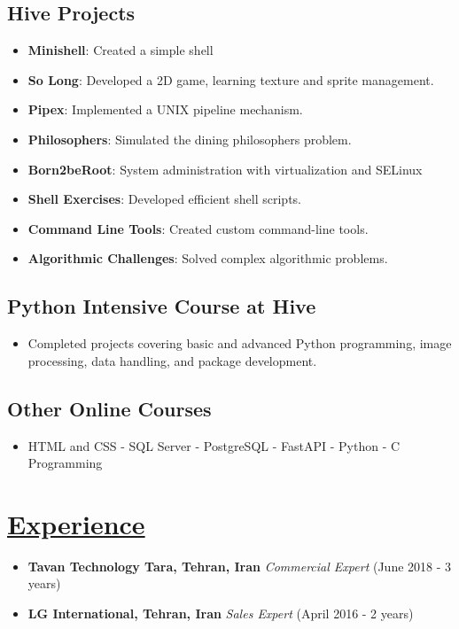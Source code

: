 \documentclass[a4paper,9pt]{article}
\newcommand{\mainsection}[1]{\underline{#1}}
\begin{document}
\subsection*{Hive Projects}
\setlength{\columnsep}{20pt} %
\begin{multicols}{2}
\begin{itemize}[leftmargin=*]
    \raggedcolumns %
    \item \textbf{Minishell}: Created a simple shell
    \item \textbf{So Long}: Developed a 2D game, learning texture and sprite management.
    \item \textbf{Pipex}: Implemented a UNIX pipeline mechanism.
    \item \textbf{Philosophers}: Simulated the dining philosophers problem.\columnbreak
     \vspace{\columnsep}
    \item \textbf{Born2beRoot}: System administration with virtualization and SELinux
    \item \textbf{Shell Exercises}: Developed efficient shell scripts.
    \item \textbf{Command Line Tools}: Created custom command-line tools.
    \item \textbf{Algorithmic Challenges}: Solved complex algorithmic problems.
  \end{itemize}
\end{multicols}

\subsection*{Python Intensive Course at Hive}
\begin{itemize}[leftmargin=*]
  \item Completed projects covering basic and advanced Python programming, image processing, data handling, and package development.
\end{itemize}

\subsection*{Other Online Courses}
\begin{itemize}[leftmargin=*]
  \item HTML and CSS - SQL Server - PostgreSQL - FastAPI - Python - C Programming
\end{itemize}

\section*{\mainsection{Experience}}
\begin{itemize}[leftmargin=*]
  \item \textbf{Tavan Technology Tara, Tehran, Iran} \textit{Commercial Expert} (June 2018 - 3 years)
  \item \textbf{LG International, Tehran, Iran} \textit{Sales Expert} (April 2016 - 2 years)
\end{itemize}
\end{document}
